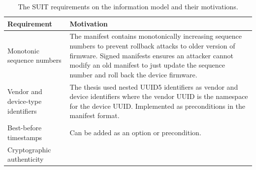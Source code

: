 \documentclass[0-thesis.tex]{subfiles}
\begin{document}
\begin{longtable}[]{@{}ll@{}}
    \caption{The SUIT requirements on the information model and their motivations.}
    \label{tab:information-evaluation}\\
    \toprule
    \begin{minipage}[b]{0.37\columnwidth}\raggedright\strut
    Requirement\strut
    \end{minipage} & \begin{minipage}[b]{0.57\columnwidth}\raggedright\strut
    Motivation\strut
    \end{minipage}\tabularnewline
    \midrule
    \endhead

    \begin{minipage}[t]{0.37\columnwidth}\raggedright\strut
    Monotonic sequence numbers\strut
    \end{minipage} & \begin{minipage}[t]{0.57\columnwidth}\raggedright\strut
    The manifest contains monotonically increasing sequence numbers to
    prevent rollback attacks to older version of firmware. Signed manifests
    ensures an attacker cannot modify an old manifest to just update the
    sequence number and roll back the device firmware.\strut
    \end{minipage}\tabularnewline
    \begin{minipage}[t]{0.37\columnwidth}\raggedright\strut
    Vendor and device-type identifiers\strut
    \end{minipage} & \begin{minipage}[t]{0.57\columnwidth}\raggedright\strut
    The thesis used nested UUID5 identifiers as vendor and device
    identifiers where the vendor UUID is the namespace for the device UUID.
    Implemented as preconditions in the manifest format.\strut
    \end{minipage}\tabularnewline
    \begin{minipage}[t]{0.37\columnwidth}\raggedright\strut
    Best-before timestamps\strut
    \end{minipage} & \begin{minipage}[t]{0.57\columnwidth}\raggedright\strut
    Can be added as an option or precondition.\strut
    \end{minipage}\tabularnewline
    \begin{minipage}[t]{0.37\columnwidth}\raggedright\strut
    Cryptographic authenticity\strut
    \end{minipage} & \begin{minipage}[t]{0.57\columnwidth}\raggedright\strut

\end{minipage}
\end{longtable}
\end{document}
